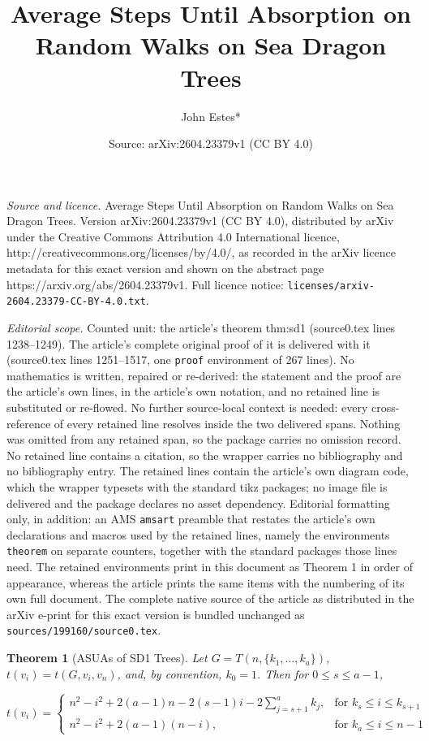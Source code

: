 \documentclass[10pt,a4paper]{amsart}
\title{Average Steps Until Absorption on Random Walks on Sea Dragon Trees}
\author{John Estes*}
\date{Source: arXiv:2604.23379v1 (CC BY 4.0)}
\newtheorem{theorem}{Theorem}
\begin{document}
\maketitle

\noindent\emph{Source and licence.} Average Steps Until Absorption on Random Walks on Sea Dragon Trees. Version arXiv:2604.23379v1 (CC BY 4.0), distributed by arXiv under the Creative Commons Attribution 4.0 International licence, http://creativecommons.org/licenses/by/4.0/, as recorded in the arXiv licence metadata for this exact version and shown on the abstract page https://arxiv.org/abs/2604.23379v1. Full licence notice: \texttt{licenses/arxiv-2604.23379-CC-BY-4.0.txt}.\par\smallskip

\noindent\textit{Editorial scope.} Counted unit: the article's theorem thm:sd1 (source0.tex lines 1238--1249). The article's complete original proof of it is delivered with it (source0.tex lines 1251--1517, one \texttt{proof} environment of 267 lines). No mathematics is written, repaired or re-derived: the statement and the proof are the article's own lines, in the article's own notation, and no retained line is substituted or re-flowed.  No further source-local context is needed: every cross-reference of every retained line resolves inside the two delivered spans.  Nothing was omitted from any retained span, so the package carries no omission record.  No retained line contains a citation, so the wrapper carries no bibliography and no bibliography entry.  The retained lines contain the article's own diagram code, which the wrapper typesets with the standard tikz packages; no image file is delivered and the package declares no asset dependency.  Editorial formatting only, in addition: an AMS \texttt{amsart} preamble that restates the article's own declarations and macros used by the retained lines, namely the environments \texttt{theorem} on separate counters, together with the standard packages those lines need.  The retained environments print in this document as Theorem 1 in order of appearance, whereas the article prints the same items with the numbering of its own full document.  The complete native source of the article as distributed in the arXiv e-print for this exact version is bundled unchanged as \texttt{sources/199160/source0.tex}.
\begin{theorem}[ASUAs of SD1 Trees]
\label{thm:sd1}
\noindent Let $G = T(n,\{k_1,\ldots, k_a\})$, $t(v_i) = t(G,v_i,v_n)$, and, by convention, $k_0 = 1$. Then for $0 \leq s \leq a-1$,

\[
t(v_i) = 
\begin{cases}
    n^2- i^2 +2(a-1)n -2(s-1)i -2\displaystyle\sum_{j=s+1}^a k_j, & \text{for } k_s \leq i \leq k_{s+1} \\
    n^2- i^2 + 2(a-1)(n-i), & \text{for } k_{a} \leq i \leq n-1 
\end{cases}
\]
\end{theorem}
\end{document}
